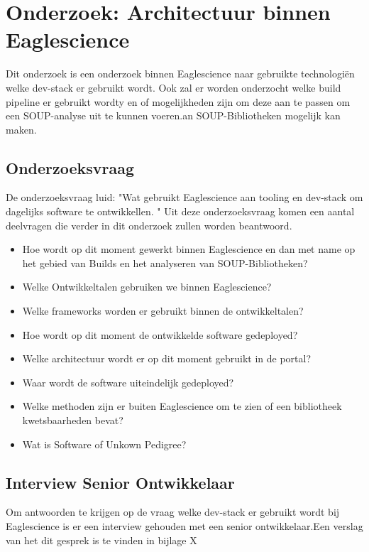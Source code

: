 
\chapter{Onderzoek: Architectuur binnen Eaglescience} %

\label{OnderzoekArchituur} %
Dit onderzoek is een onderzoek binnen Eaglescience naar gebruikte technologi\"en welke dev-stack er gebruikt wordt. Ook zal er worden onderzocht welke build pipeline er gebruikt wordty en of mogelijkheden zijn om deze aan te passen om een SOUP-analyse uit te kunnen voeren.an SOUP-Bibliotheken mogelijk kan maken.
\section{Onderzoeksvraag}
De onderzoeksvraag luid: "Wat gebruikt Eaglescience aan tooling en dev-stack om dagelijks software te ontwikkellen. "
Uit deze onderzoeksvraag komen een aantal deelvragen die verder in dit onderzoek zullen worden beantwoord.
\begin{itemize}
  \item Hoe wordt op dit moment gewerkt binnen Eaglescience en dan met name op het gebied van Builds en het analyseren van SOUP-Bibliotheken?
  \item Welke Ontwikkeltalen gebruiken we binnen Eaglescience?

  \item Welke frameworks worden er gebruikt binnen de ontwikkeltalen?

  \item Hoe wordt op dit moment de ontwikkelde software gedeployed?
  \item Welke architectuur wordt er op dit moment gebruikt in de portal?
  \item Waar wordt de software uiteindelijk gedeployed?
  \item Welke methoden zijn er buiten Eaglescience om te zien of een bibliotheek kwetsbaarheden bevat?
  \item Wat is Software of Unkown Pedigree?
\end{itemize}


\section{Interview Senior Ontwikkelaar}
Om antwoorden te krijgen op de vraag welke dev-stack er gebruikt wordt bij Eaglescience is er een interview gehouden met een senior ontwikkelaar.Een verslag van het dit gesprek is te vinden in bijlage X%



